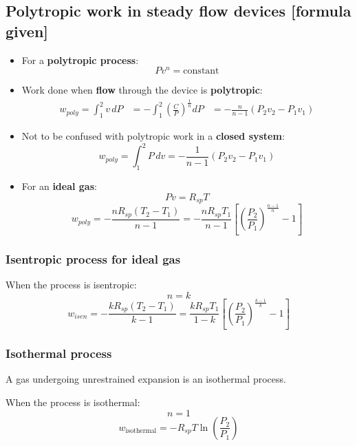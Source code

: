 \documentclass[11pt]{article}
\begin{document}
 \newpage
\subsection{Polytropic work in steady flow devices [formula given]}
\label{sec:org72dceb0}
\begin{itemize}
\item For a \textbf{polytropic process}:
\[Pv^n = \text{constant}\]
\item Work done when \textbf{flow} through the device is \textbf{polytropic}:
\begin{align*}
w_{poly} = \int_1^2 v \, dP &= - \int_1^2 \left(\frac{C}{P} \right)^{\frac{1}{n}} dP
&= - \frac{n}{n - 1}(P_2 v_2 - P_1 v_1)
\end{align*}
\item Not to be confused with polytropic work in a \textbf{closed system}:
\[w_{poly} = \int_1^2 P \, dv = - \frac{1}{n - 1} (P_2 v_2 - P_1 v_1)\]
\item For an \textbf{ideal gas}:
\[Pv = R_{sp} T\]
\[w_{poly} = - \frac{n R_{sp} (T_2 - T_1)}{n - 1} = - \frac{n R_{sp} T_1}{n - 1} \left[\left(\frac{P_2}{P_1} \right)^{\frac{n - 1}{n}} - 1 \right]\]
\end{itemize}
\subsubsection{Isentropic process for ideal gas}
\label{sec:org3a59c22}
When the process is isentropic:
\[n = k\]
\[w_{isen} = - \frac{k R_{sp} (T_2 - T_1)}{k - 1} = \frac{k R_{sp} T_1}{1 - k} \left[\left(\frac{P_2}{P_1} \right)^{\frac{k - 1}{k}} - 1 \right]\]
\subsubsection{Isothermal process}
\label{sec:org2991293}
A gas undergoing unrestrained expansion is an isothermal process.

When the process is isothermal:
\[n = 1\]
\[w_{\text{isothermal}} = - R_{sp} T \ln \left(\frac{P_2}{P_1} \right)\]
\end{document}
